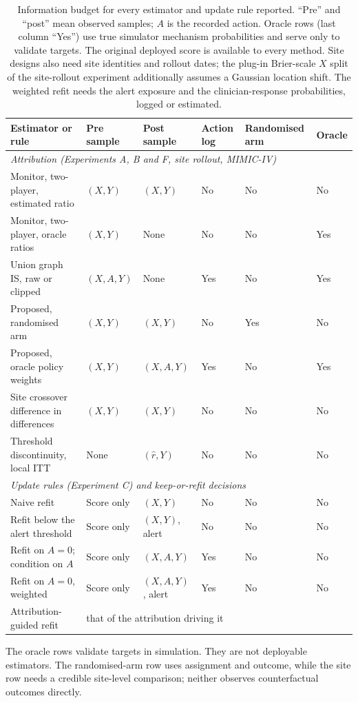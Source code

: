 \documentclass[letterpaper]{article} %
\newcommand{\rhat}{\hat r}
\begin{document}
\begin{table}[t]
\centering\small
\caption{Information budget for every estimator and update rule reported.
``Pre'' and ``post'' mean observed samples; $A$ is the recorded action.
Oracle rows (last column ``Yes'') use true simulator mechanism probabilities
and serve only to validate targets. The original deployed score is available
to every method. Site designs also need site identities and rollout dates;
the plug-in Brier-scale $X$ split of the site-rollout experiment additionally assumes a Gaussian
location shift. The weighted refit needs the alert exposure and the
clinician-response probabilities, logged or estimated.}
\label{tab:information}
\begin{tabular}{llllll}
\toprule
Estimator or rule & Pre sample & Post sample & Action log & Randomised arm & Oracle\\
\midrule
\multicolumn{6}{l}{\emph{Attribution (Experiments A, B and F, site rollout, MIMIC-IV)}}\\
Monitor, two-player, estimated ratio & $(X,Y)$ & $(X,Y)$ & No & No & No\\
Monitor, two-player, oracle ratios & $(X,Y)$ & None & No & No & Yes\\
Union graph IS, raw or clipped & $(X,A,Y)$ & None & Yes & No & Yes\\
Proposed, randomised arm & $(X,Y)$ & $(X,Y)$ & No & Yes & No\\
Proposed, oracle policy weights & $(X,Y)$ & $(X,A,Y)$ & Yes & No & Yes\\
Site crossover difference in differences & $(X,Y)$ & $(X,Y)$ & No & No & No\\
Threshold discontinuity, local ITT & None & $(\rhat,Y)$ & No & No & No\\
\multicolumn{6}{l}{\emph{Update rules (Experiment C) and keep-or-refit decisions}}\\
Naive refit & Score only & $(X,Y)$ & No & No & No\\
Refit below the alert threshold & Score only & $(X,Y)$, alert & No & No & No\\
Refit on $A=0$; condition on $A$ & Score only & $(X,A,Y)$ & Yes & No & No\\
Refit on $A=0$, weighted & Score only & $(X,A,Y)$, alert & Yes & No & No\\
Attribution-guided refit & \multicolumn{5}{l}{that of the attribution driving it}\\
\bottomrule
\end{tabular}
\end{table}
The oracle rows validate targets in simulation. They are not deployable
estimators. The randomised-arm row uses assignment and outcome, while the site
row needs a credible site-level comparison; neither observes counterfactual
outcomes directly.
\end{document}
